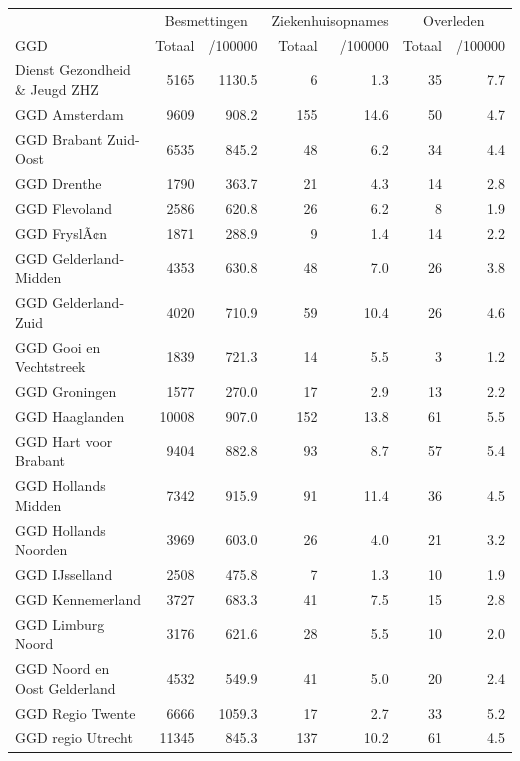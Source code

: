 \documentclass[
  english,
  man,floatsintext]{apa6}
\begin{document}
\begin{table}[H]
\centering\begingroup\fontsize{10}{12}\selectfont

\begin{threeparttable}
\begin{tabular}{lrrrrrr}
\toprule
\multicolumn{1}{c}{ } & \multicolumn{2}{c}{Besmettingen} & \multicolumn{2}{c}{Ziekenhuisopnames} & \multicolumn{2}{c}{Overleden} \\
\cmidrule(l{3pt}r{3pt}){2-3} \cmidrule(l{3pt}r{3pt}){4-5} \cmidrule(l{3pt}r{3pt}){6-7}
GGD & Totaal & /100000 & Totaal & /100000 & Totaal & /100000\\
\midrule
Dienst Gezondheid \& Jeugd ZHZ & 5165 & 1130.5 & 6 & 1.3 & 35 & 7.7\\
GGD Amsterdam & 9609 & 908.2 & 155 & 14.6 & 50 & 4.7\\
GGD Brabant Zuid-Oost & 6535 & 845.2 & 48 & 6.2 & 34 & 4.4\\
GGD Drenthe & 1790 & 363.7 & 21 & 4.3 & 14 & 2.8\\
GGD Flevoland & 2586 & 620.8 & 26 & 6.2 & 8 & 1.9\\
GGD FryslÃ¢n & 1871 & 288.9 & 9 & 1.4 & 14 & 2.2\\
GGD Gelderland-Midden & 4353 & 630.8 & 48 & 7.0 & 26 & 3.8\\
GGD Gelderland-Zuid & 4020 & 710.9 & 59 & 10.4 & 26 & 4.6\\
GGD Gooi en Vechtstreek & 1839 & 721.3 & 14 & 5.5 & 3 & 1.2\\
GGD Groningen & 1577 & 270.0 & 17 & 2.9 & 13 & 2.2\\
GGD Haaglanden & 10008 & 907.0 & 152 & 13.8 & 61 & 5.5\\
GGD Hart voor Brabant & 9404 & 882.8 & 93 & 8.7 & 57 & 5.4\\
GGD Hollands Midden & 7342 & 915.9 & 91 & 11.4 & 36 & 4.5\\
GGD Hollands Noorden & 3969 & 603.0 & 26 & 4.0 & 21 & 3.2\\
GGD IJsselland & 2508 & 475.8 & 7 & 1.3 & 10 & 1.9\\
GGD Kennemerland & 3727 & 683.3 & 41 & 7.5 & 15 & 2.8\\
GGD Limburg Noord & 3176 & 621.6 & 28 & 5.5 & 10 & 2.0\\
GGD Noord en Oost Gelderland & 4532 & 549.9 & 41 & 5.0 & 20 & 2.4\\
GGD Regio Twente & 6666 & 1059.3 & 17 & 2.7 & 33 & 5.2\\
GGD regio Utrecht & 11345 & 845.3 & 137 & 10.2 & 61 & 4.5\\

\end{tabular}
\end{threeparttable}
\end{table}
\end{document}
